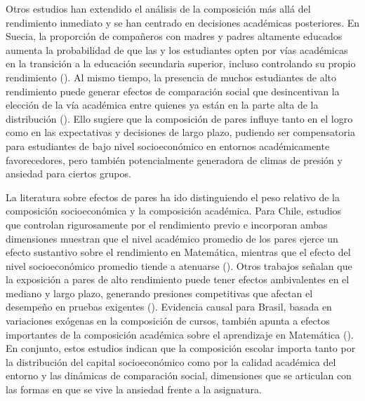 \documentclass[
  spanish,
  a4paper,
  oneside]{scrbook}
\begin{document}
Otros estudios han extendido el análisis de la composición más allá del
rendimiento inmediato y se han centrado en decisiones académicas
posteriores. En Suecia, la proporción de compañeros con madres y padres
altamente educados aumenta la probabilidad de que las y los estudiantes
opten por vías académicas en la transición a la educación secundaria
superior, incluso controlando su propio rendimiento
().
Al mismo tiempo, la presencia de muchos estudiantes de alto rendimiento
puede generar efectos de comparación social que desincentivan la
elección de la vía académica entre quienes ya están en la parte alta de
la distribución (). Ello
sugiere que la composición de pares influye tanto en el logro como en
las expectativas y decisiones de largo plazo, pudiendo ser compensatoria
para estudiantes de bajo nivel socioeconómico en entornos académicamente
favorecedores, pero también potencialmente generadora de climas de
presión y ansiedad para ciertos grupos.

La literatura sobre efectos de pares ha ido distinguiendo el peso
relativo de la composición socioeconómica y la composición académica.
Para Chile, estudios que controlan rigurosamente por el rendimiento
previo e incorporan ambas dimensiones muestran que el nivel académico
promedio de los pares ejerce un efecto sustantivo sobre el rendimiento
en Matemática, mientras que el efecto del nivel socioeconómico promedio
tiende a atenuarse (). Otros trabajos señalan que la exposición a pares de alto
rendimiento puede tener efectos ambivalentes en el mediano y largo
plazo, generando presiones competitivas que afectan el desempeño en
pruebas exigentes (). Evidencia causal para Brasil, basada en variaciones exógenas en
la composición de cursos, también apunta a efectos importantes de la
composición académica sobre el aprendizaje en Matemática
(). En
conjunto, estos estudios indican que la composición escolar importa
tanto por la distribución del capital socioeconómico como por la calidad
académica del entorno y las dinámicas de comparación social, dimensiones
que se articulan con las formas en que se vive la ansiedad frente a la
asignatura.
\end{document}
